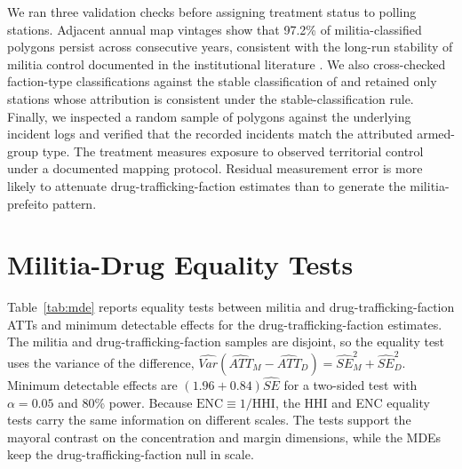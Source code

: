 \documentclass[11pt]{article}
\begin{document}
We ran three validation checks before assigning treatment status to polling stations. Adjacent annual map vintages show that 97.2\% of militia-classified polygons persist across consecutive years, consistent with the long-run stability of militia control documented in the institutional literature \citep{pantaleao2025elections}. We also cross-checked faction-type classifications against the stable classification of \citet{monteiro2023enterprises} and retained only stations whose attribution is consistent under the stable-classification rule. Finally, we inspected a random sample of polygons against the underlying incident logs and verified that the recorded incidents match the attributed armed-group type. The treatment measures exposure to observed territorial control under a documented mapping protocol. Residual measurement error is more likely to attenuate drug-trafficking-faction estimates than to generate the militia-prefeito pattern.

\section{Militia-Drug Equality Tests}\label{app:mde}

Table~\ref{tab:mde} reports equality tests between militia and drug-trafficking-faction ATTs and minimum detectable effects for the drug-trafficking-faction estimates. The militia and drug-trafficking-faction samples are disjoint, so the equality test uses the variance of the difference, $\widehat{Var}(\widehat{ATT}_M - \widehat{ATT}_D) = \widehat{SE}_M^2 + \widehat{SE}_D^2$. Minimum detectable effects are $(1.96 + 0.84)\widehat{SE}$ for a two-sided test with $\alpha = 0.05$ and 80\% power. Because $\text{ENC}\equiv 1/\text{HHI}$, the HHI and ENC equality tests carry the same information on different scales. The tests support the mayoral contrast on the concentration and margin dimensions, while the MDEs keep the drug-trafficking-faction null in scale.
\end{document}
